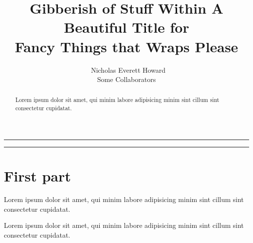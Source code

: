






\settings
{}

\title{Gibberish of Stuff Within A Beautiful Title for\\
Fancy Things that Wraps Please}
\author{\Large{\ Nicholas Everett Howard}
\smallskip\\
Some Collaborators
}
\date{}
\maketitle

\thispagestyle{titlepage}

\vspace{4mm}
\hrule
\vspace{4mm}
\begin{abstract}
\normalsize
Lorem ipsum dolor sit amet, qui minim labore adipisicing minim sint cillum sint
consectetur cupidatat.
\end{abstract}

\vspace{4mm}
\hrule
\vspace{4mm}

\tableofcontents
\settings
\newpage


\section{First part}
Lorem ipsum dolor sit amet, qui minim labore adipisicing minim sint cillum sint
consectetur cupidatat.


Lorem ipsum dolor sit amet, qui minim labore adipisicing minim sint cillum sint
consectetur cupidatat.


